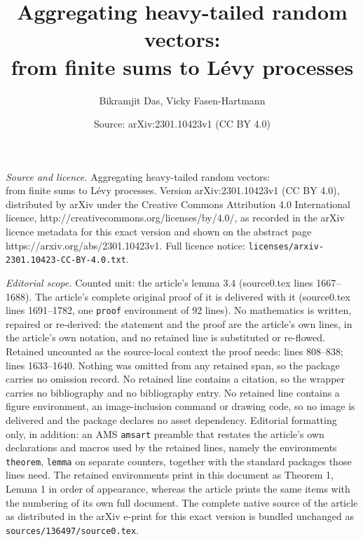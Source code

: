 \documentclass[10pt,a4paper]{amsart}
\title{Aggregating heavy-tailed random vectors:\\ from finite sums to L\'evy processes}
\author{Bikramjit Das, Vicky Fasen-Hartmann}
\date{Source: arXiv:2301.10423v1 (CC BY 4.0)}
\begin{document}
\maketitle

\noindent\emph{Source and licence.} Aggregating heavy-tailed random vectors:\\ from finite sums to L\'evy processes. Version arXiv:2301.10423v1 (CC BY 4.0), distributed by arXiv under the Creative Commons Attribution 4.0 International licence, http://creativecommons.org/licenses/by/4.0/, as recorded in the arXiv licence metadata for this exact version and shown on the abstract page https://arxiv.org/abs/2301.10423v1. Full licence notice: \texttt{licenses/arxiv-2301.10423-CC-BY-4.0.txt}.\par\smallskip

\noindent\textit{Editorial scope.} Counted unit: the article's lemma 3.4 (source0.tex lines 1667--1688). The article's complete original proof of it is delivered with it (source0.tex lines 1691--1782, one \texttt{proof} environment of 92 lines). No mathematics is written, repaired or re-derived: the statement and the proof are the article's own lines, in the article's own notation, and no retained line is substituted or re-flowed.  Retained uncounted as the source-local context the proof needs: lines 808--838; lines 1633--1640.  Nothing was omitted from any retained span, so the package carries no omission record.  No retained line contains a citation, so the wrapper carries no bibliography and no bibliography entry.  No retained line contains a figure environment, an image-inclusion command or drawing code, so no image is delivered and the package declares no asset dependency.  Editorial formatting only, in addition: an AMS \texttt{amsart} preamble that restates the article's own declarations and macros used by the retained lines, namely the environments \texttt{theorem}, \texttt{lemma} on separate counters, together with the standard packages those lines need.  The retained environments print in this document as Theorem 1, Lemma 1 in order of appearance, whereas the article prints the same items with the numbering of its own full document.  The complete native source of the article as distributed in the arXiv e-print for this exact version is bundled unchanged as \texttt{sources/136497/source0.tex}.
\end{document}
